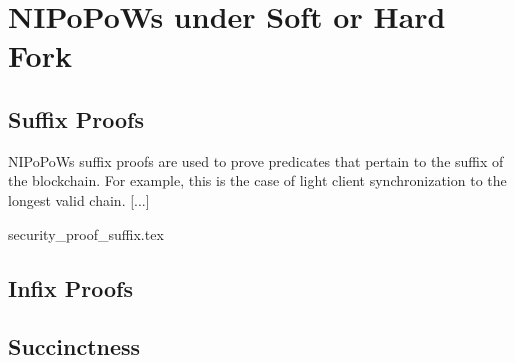 \section{NIPoPoWs under Soft or Hard Fork}

\subsection{Suffix Proofs}
NIPoPoWs suffix proofs are used to prove predicates that pertain to the suffix of the blockchain. For example, this is the case of light client synchronization to the longest valid chain.
 [...]
 
{security_proof_suffix.tex} 
 
\subsection{Infix Proofs}

\subsection{Succinctness}
 

